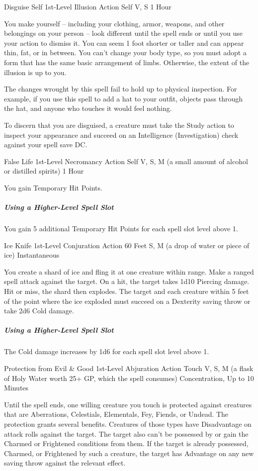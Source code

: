 \documentclass[letterpaper,openany,oneside,twocolumn]{book}
\begin{document}
\DndSpellHeader
  {Disguise Self}
  {1st-Level Illusion}
  {Action}
  {Self}
  {V, S}
  {1 Hour}

You make yourself – including your clothing, armor, weapons, and other belongings on your person – look different until the spell ends or until you use your action to dismiss it. You can seem 1 foot shorter or taller and can appear thin, fat, or in between. You can't change your body type, so you must adopt a form that has the same basic arrangement of limbs. Otherwise, the extent of the illusion is up to you.

The changes wrought by this spell fail to hold up to physical inspection. For example, if you use this spell to add a hat to your outfit, objects pass through the hat, and anyone who touches it would feel nothing.

To discern that you are disguised, a creature must take the Study action to inspect your appearance and succeed on an Intelligence (Investigation) check against your spell save DC.

\DndSpellHeader
  {False Life}
  {1st-Level Necromancy}
  {Action}
  {Self}
  {V, S, M (a small amount of alcohol or distilled spirits)}
  {1 Hour}

You gain  Temporary Hit Points.

\subparagraph*{Using a Higher-Level Spell Slot} You gain 5 additional Temporary Hit Points for each spell slot level above 1.

\DndSpellHeader
  {Ice Knife}
  {1st-Level Conjuration}
  {Action}
  {60 Feet}
  {S, M (a drop of water or piece of ice)}
  {Instantaneous}

You create a shard of ice and fling it at one creature within range. Make a ranged spell attack against the target. On a hit, the target takes 1d10 Piercing damage. Hit or miss, the shard then explodes. The target and each creature within 5 feet of the point where the ice exploded must succeed on a Dexterity saving throw or take 2d6 Cold damage.

\subparagraph*{Using a Higher-Level Spell Slot} The Cold damage increases by 1d6 for each spell slot level above 1.

\DndSpellHeader
  {Protection from Evil \& Good}
  {1st-Level Abjuration}
  {Action}
  {Touch}
  {V, S, M (a flask of Holy Water worth 25+ GP, which the spell consumes)}
  {Concentration, Up to 10 Minutes}

Until the spell ends, one willing creature you touch is protected against creatures that are Aberrations, Celestials, Elementals, Fey, Fiends, or Undead. The protection grants several benefits. Creatures of those types have Disadvantage on attack rolls against the target. The target also can't be possessed by or gain the Charmed or Frightened conditions from them. If the target is already possessed, Charmed, or Frightened by such a creature, the target has Advantage on any new saving throw against the relevant effect.
\end{document}
